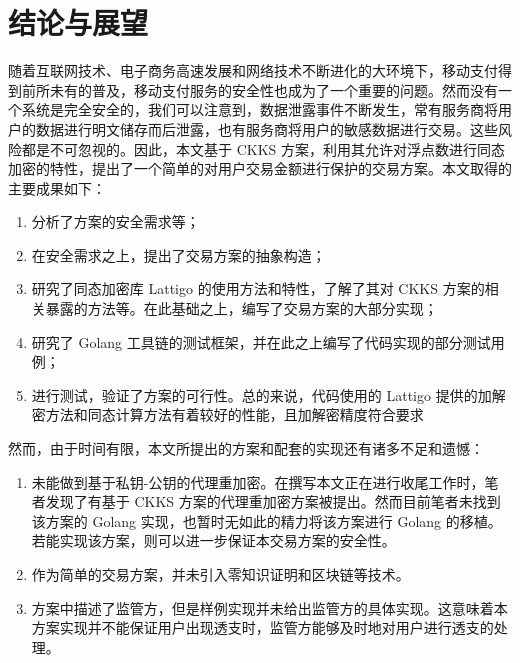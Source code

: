 \chapter{结论与展望}

随着互联网技术、电子商务高速发展和网络技术不断进化的大环境下，移动支付得到前所未有的普及，移动支付服务的安全性也成为了一个重要的问题。然而没有一个系统是完全安全的，我们可以注意到，数据泄露事件不断发生，常有服务商将用户的数据进行明文储存而后泄露，也有服务商将用户的敏感数据进行交易。这些风险都是不可忽视的。因此，本文基于 CKKS 方案，利用其允许对浮点数进行同态加密的特性，提出了一个简单的对用户交易金额进行保护的交易方案。本文取得的主要成果如下：

\begin{enumerate}
    \item 分析了方案的安全需求等；
    \item 在安全需求之上，提出了交易方案的抽象构造；
    \item 研究了同态加密库 Lattigo 的使用方法和特性，了解了其对 CKKS 方案的相关暴露的方法等。在此基础之上，编写了交易方案的大部分实现；
    \item 研究了 Golang 工具链的测试框架，并在此之上编写了代码实现的部分测试用例；
    \item 进行测试，验证了方案的可行性。总的来说，代码使用的 Lattigo 提供的加解密方法和同态计算方法有着较好的性能，且加解密精度符合要求
\end{enumerate}

然而，由于时间有限，本文所提出的方案和配套的实现还有诸多不足和遗憾：

\begin{enumerate}
    \item 未能做到基于私钥-公钥的代理重加密\cite{proxy_re_encryption}。在撰写本文正在进行收尾工作时，笔者发现了有基于 CKKS 方案的代理重加密方案被提出\cite{cryptoeprint:2017/410}。然而目前笔者未找到该方案的 Golang 实现，也暂时无如此的精力将该方案进行 Golang 的移植。若能实现该方案，则可以进一步保证本交易方案的安全性。
    \item 作为简单的交易方案，并未引入零知识证明和区块链等技术。
    \item 方案中描述了监管方，但是样例实现并未给出监管方的具体实现。这意味着本方案实现并不能保证用户出现透支时，监管方能够及时地对用户进行透支的处理。
\end{enumerate}

